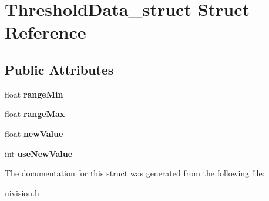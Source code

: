 \hypertarget{structThresholdData__struct}{\section{\-Threshold\-Data\-\_\-struct \-Struct \-Reference}
\label{structThresholdData__struct}
}
\subsection*{\-Public \-Attributes}
\begin{DoxyCompactItemize}
\item 
\hypertarget{structThresholdData__struct_ad0117491c9644ddf7bd4ab1965bb354f}{float {\bfseries range\-Min}}\label{structThresholdData__struct_ad0117491c9644ddf7bd4ab1965bb354f}

\item 
\hypertarget{structThresholdData__struct_a26a34939defda66770519cf3f273aeb7}{float {\bfseries range\-Max}}\label{structThresholdData__struct_a26a34939defda66770519cf3f273aeb7}

\item 
\hypertarget{structThresholdData__struct_a718a46b0ba8daa43fdd8b4f7db007d85}{float {\bfseries new\-Value}}\label{structThresholdData__struct_a718a46b0ba8daa43fdd8b4f7db007d85}

\item 
\hypertarget{structThresholdData__struct_a414adf7b97ee121194b77912af6fd803}{int {\bfseries use\-New\-Value}}\label{structThresholdData__struct_a414adf7b97ee121194b77912af6fd803}

\end{DoxyCompactItemize}


\-The documentation for this struct was generated from the following file\-:\begin{DoxyCompactItemize}
\item 
nivision.\-h\end{DoxyCompactItemize}
